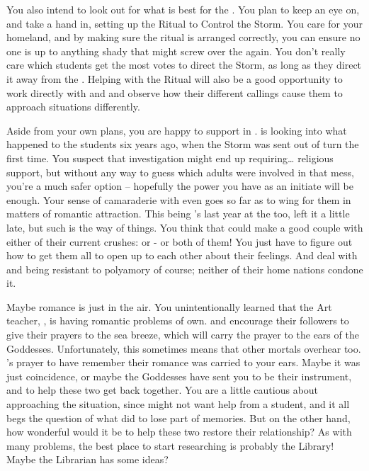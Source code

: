 \documentclass[char]{GL2020}
\begin{document}
You also intend to look out for what is best for the \pShip{}. You plan to keep an eye on, and take a hand in, setting up the Ritual to Control the Storm. You care for your homeland, and by making sure the ritual is arranged correctly, you can ensure no one is up to anything shady that might screw over the \pShippies{} again. You don't really care which students get the most votes to direct the Storm, as long as they direct it away from the \pShip{}. Helping with the Ritual will also be a good opportunity to work directly with \cEbbPriest{} and \cFlowPriest{} and observe how their different callings cause them to approach situations differently.

Aside from your own plans, you are happy to support \cPresident{} in \cPresident{\theirs}. \cPresident{} is looking into what happened to the students six years ago, when the Storm was sent out of turn the first time. You suspect that investigation might end up requiring\ldots{} religious support, but without any way to guess which adults were involved in that mess, you're a much safer option -- hopefully the power you have as an initiate will be enough. Your sense of camaraderie with \cPresident{} even goes so far as to wing\cInitiate{\person} for them in matters of romantic attraction. This being \cPresident{}'s last year at the \pSc{} too, \cPresident{\they} \cPresident{\have} left it a little late, but such is the way of things. You think that \cPresident{} could make a good couple with either of their current crushes: \cHeir{\full} or \cChupStudent{\full} - or both of them! You just have to figure out how to get them all to open up to each other about their feelings. And deal with \cHeir{} and \cChupStudent{} being resistant to polyamory of course; neither of their home nations condone it.

Maybe romance is just in the air. You unintentionally learned that the Art teacher, \cChupAvenger{\full}, is having romantic problems of \cChupAvenger{\their} own. \cEbb{} and \cFlow{} encourage their followers to give their prayers to the sea breeze, which will carry the prayer to the ears of the Goddesses. Unfortunately, this sometimes means that other mortals overhear too. \cChupAvenger{}'s prayer to have \cHeadScientist{\full} remember their romance was carried to your ears. Maybe it was just coincidence, or maybe the Goddesses have sent you to be their instrument, and to help these two get back together. You are a little cautious about approaching the situation, since \cChupAvenger{} might not want help from a student, and it all begs the question of what \cHeadScientist{} did to lose part of \cHeadScientist{\their} memories. But on the other hand, how wonderful would it be to help these two restore their relationship? As with many problems, the best place to start researching is probably the Library! Maybe the Librarian has some ideas? 
\end{document}
